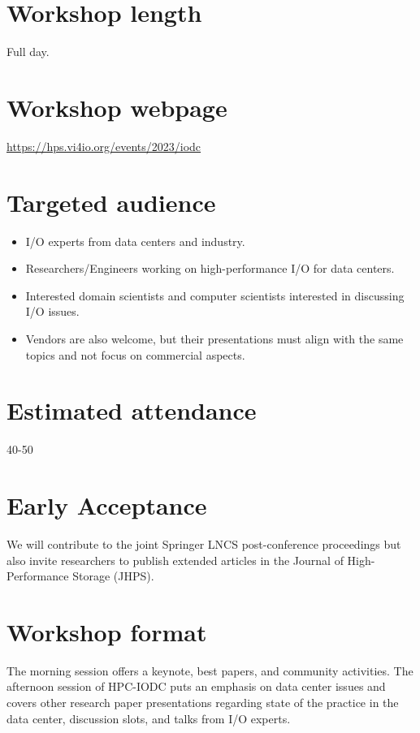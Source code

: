 \documentclass[a4paper,10pt]{article}
\begin{document}
\section{Workshop length}
Full day.

\section{Workshop webpage}
\url{https://hps.vi4io.org/events/2023/iodc}


\section{Targeted audience}
\begin{itemize}
\item I/O experts from data centers and industry.
\item Researchers/Engineers working on high-performance I/O for data centers.
\item Interested domain scientists and computer scientists interested in discussing I/O issues.
\item Vendors are also welcome, but their presentations must align with the same topics and not focus on commercial aspects.
\end{itemize}




\section{Estimated attendance}
40-50

\section{Early Acceptance}

We will contribute to the joint Springer LNCS post-conference proceedings but also invite researchers to publish extended articles in the Journal of High-Performance Storage (JHPS).


\section{Workshop format}
The morning session offers a keynote, best papers, and community activities.
The afternoon session of HPC-IODC puts an emphasis on data center issues and covers other research paper presentations regarding state of the practice in the data center, discussion slots, and talks from I/O experts.
\end{document}
